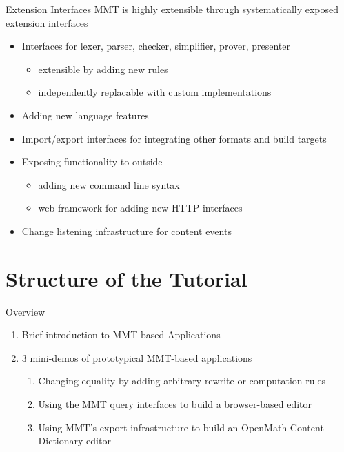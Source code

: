 \documentclass{beamer}
\begin{document}
\begin{myframe}{Extension Interfaces}
MMT is highly extensible through systematically exposed extension interfaces
\begin{itemize}
 \item Interfaces for lexer, parser, checker, simplifier, prover, presenter
   \begin{itemize}
    \item extensible by adding new rules
    \item independently replacable with custom implementations
   \end{itemize}
 \item Adding new language features
 \item Import/export interfaces for integrating other formats and build targets
 \item Exposing functionality to outside
  \begin{itemize}
    \item adding new command line syntax
    \item web framework for adding new HTTP interfaces
  \end{itemize}
 \item Change listening infrastructure for content events
\end{itemize}
\end{myframe}


\section{Structure of the Tutorial}

\begin{myframe}{Overview}
\begin{enumerate}
 \item Brief introduction to MMT-based Applications
 \item 3 mini-demos of prototypical MMT-based applications 
   \begin{enumerate}
    \item Changing equality by adding arbitrary rewrite or computation rules
    \item Using the MMT query interfaces to build a browser-based editor
    \item Using MMT's export infrastructure to build an OpenMath Content Dictionary editor
   \end{enumerate}
 \end{enumerate}
\end{myframe}
\end{document}
